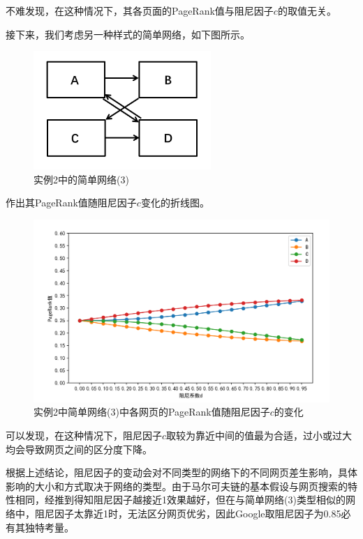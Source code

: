 \documentclass[UTF8,openany]{ctexbook}
\begin{document}
不难发现，在这种情况下，其各页面的PageRank值与阻尼因子$c$的取值无关。

接下来，我们考虑另一种样式的简单网络，如下图所示。
\begin{figure}[H]
    \begin{center}
        \includegraphics[width=0.6\textwidth]{images/pic2(3).png}
        \caption{实例2中的简单网络(3)}
    \end{center}
\end{figure}

作出其PageRank值随阻尼因子$c$变化的折线图。
\begin{figure}[H]
    \begin{center}
        \includegraphics[width=1\textwidth]{images/pic2-3.png}
        \caption{实例2中简单网络(3)中各网页的PageRank值随阻尼因子$c$的变化}
    \end{center}
\end{figure}
可以发现，在这种情况下，阻尼因子$c$取较为靠近中间的值最为合适，过小或过大均会导致网页之间的区分度下降。

根据上述结论，阻尼因子的变动会对不同类型的网络下的不同网页差生影响，具体影响的大小和方式取决于网络的类型。由于马尔可夫链的基本假设与网页搜索的特性相同，经推到得知阻尼因子越接近1效果越好\cite{bi:TW}，但在与简单网络(3)类型相似的网络中，阻尼因子太靠近1时，无法区分网页优劣，因此Google取阻尼因子为0.85必有其独特考量\cite{bi:TW,bi:G}。
\end{document}
